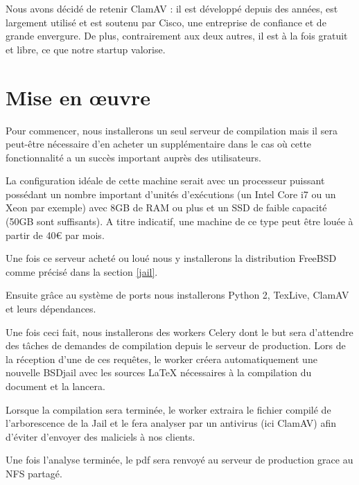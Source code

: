 \documentclass[10pt,a4paper]{article}
\begin{document}
Nous avons décidé de retenir ClamAV : il est développé depuis des années, est largement utilisé et est soutenu par Cisco, une entreprise de confiance et de grande envergure. De plus, contrairement aux deux autres, il est à la fois gratuit et libre, ce que notre startup valorise.

\section{Mise en œuvre}

Pour commencer, nous installerons un seul serveur de compilation mais il sera peut-être nécessaire d'en acheter un supplémentaire dans le cas où cette fonctionnalité a un succès important auprès des utilisateurs.

La configuration idéale de cette machine serait avec un processeur puissant possédant un nombre important d'unités d'exécutions (un Intel Core i7 ou un Xeon par exemple) avec 8GB de RAM ou plus et un SSD de faible capacité (50GB sont suffisants).
A titre indicatif, une machine de ce type peut être louée à partir de 40\euro { }par mois.


Une fois ce serveur acheté ou loué nous y installerons la distribution FreeBSD comme précisé dans la section \ref{jail}.

Ensuite grâce au système de ports nous installerons Python 2, TexLive, ClamAV et leurs dépendances.


Une fois ceci fait, nous installerons des workers Celery dont le but sera d'attendre des tâches de demandes de compilation depuis le serveur de production.
Lors de la réception d'une de ces requêtes, le worker créera automatiquement une nouvelle BSDjail avec les sources \LaTeX { }nécessaires à la compilation du document et la lancera.

Lorsque la compilation sera terminée, le worker extraira le fichier compilé de l'arborescence de la Jail et le fera analyser par un antivirus (ici ClamAV) afin d'éviter d'envoyer des maliciels à nos clients.

Une fois l'analyse terminée, le pdf sera renvoyé au serveur de production grace au NFS partagé.
\end{document}
